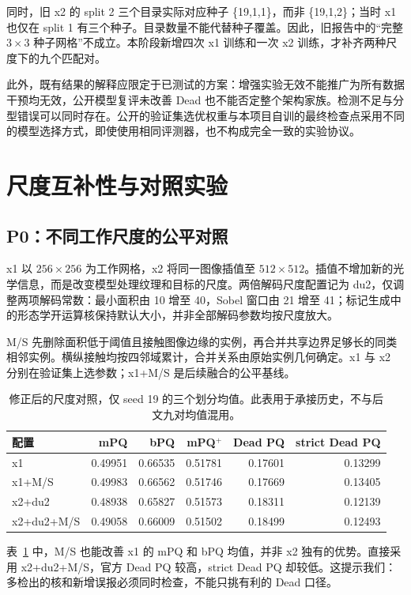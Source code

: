 \documentclass[11pt,a4paper,UTF8,fontset=fandol]{ctexart}
\begin{document}
同时，旧 x2 的 split 2 三个目录实际对应种子 \{19,1,1\}，而非 \{19,1,2\}；当时 x1 也仅在 split 1 有三个种子。目录数量不能代替种子覆盖。因此，旧报告中的“完整 $3\times3$ 种子网格”不成立。本阶段新增四次 x1 训练和一次 x2 训练，才补齐两种尺度下的九个匹配对。

此外，既有结果的解释应限定于已测试的方案：增强实验无效不能推广为所有数据干预均无效，公开模型复评未改善 Dead 也不能否定整个架构家族。检测不足与分型错误可以同时存在。公开的验证集选优权重与本项目自训的最终检查点采用不同的模型选择方式，即使使用相同评测器，也不构成完全一致的实验协议。

\section{尺度互补性与对照实验}

\subsection{P0：不同工作尺度的公平对照}

x1 以 $256\times256$ 为工作网格，x2 将同一图像插值至 $512\times512$。插值不增加新的光学信息，而是改变模型处理纹理和目标的尺度。两倍解码尺度配置记为 du2，仅调整两项解码常数：最小面积由 10 增至 40，Sobel 窗口由 21 增至 41；标记生成中的形态学开运算核保持默认大小，并非全部解码参数均按尺度放大。

M/S 先删除面积低于阈值且接触图像边缘的实例，再合并共享边界足够长的同类相邻实例。横纵接触均按四邻域累计，合并关系由原始实例几何确定。x1 与 x2 分别在验证集上选参数；x1+M/S 是后续融合的公平基线。

\begin{table}[H]
\centering\small
\caption{修正后的尺度对照，仅 seed 19 的三个划分均值。此表用于承接历史，不与后文九对均值混用。}
\label{tab:p0}
\begin{tabular}{lrrrrr}\toprule
配置 & mPQ & bPQ & mPQ$^+$ & Dead PQ & strict Dead PQ\\\midrule
x1 & 0.49951 & 0.66535 & 0.51781 & 0.17601 & 0.13299\\
x1+M/S & 0.49983 & 0.66562 & 0.51746 & 0.17669 & 0.13405\\
x2+du2 & 0.48938 & 0.65827 & 0.51573 & 0.18311 & 0.12139\\
x2+du2+M/S & 0.49058 & 0.66009 & 0.51502 & 0.18499 & 0.12493\\\bottomrule
\end{tabular}
\end{table}

表~\ref{tab:p0} 中，M/S 也能改善 x1 的 mPQ 和 bPQ 均值，并非 x2 独有的优势。直接采用 x2+du2+M/S，官方 Dead PQ 较高，strict Dead PQ 却较低。这提示我们：多检出的核和新增误报必须同时检查，不能只挑有利的 Dead 口径。
\end{document}

